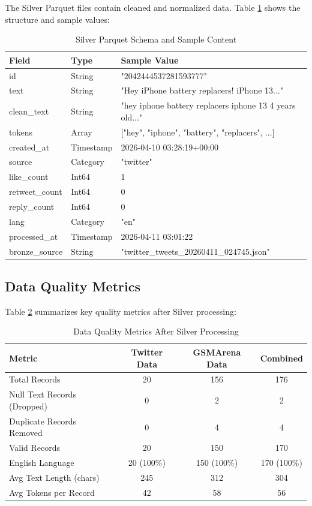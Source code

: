 \documentclass[11pt,a4paper]{article}
\begin{document}
The Silver Parquet files contain cleaned and normalized data. Table \ref{tab:silver-schema-content} shows the structure and sample values:

\begin{table}[H]
\centering
\begin{tabular}{>{\ttfamily}l l p{5cm}}
\toprule
\textbf{Field} & \textbf{Type} & \textbf{Sample Value} \\
\midrule
id & String & "2042444537281593777" \\
text & String & "Hey iPhone battery replacers! iPhone 13..." \\
clean\_text & String & "hey iphone battery replacers iphone 13 4 years old..." \\
tokens & Array & ["hey", "iphone", "battery", "replacers", ...] \\
created\_at & Timestamp & 2026-04-10 03:28:19+00:00 \\
source & Category & "twitter" \\
like\_count & Int64 & 1 \\
retweet\_count & Int64 & 0 \\
reply\_count & Int64 & 0 \\
lang & Category & "en" \\
processed\_at & Timestamp & 2026-04-11 03:01:22 \\
bronze\_source & String & "twitter\_tweets\_20260411\_024745.json" \\
\bottomrule
\end{tabular}
\caption{Silver Parquet Schema and Sample Content}
\label{tab:silver-schema-content}
\end{table}

\subsection{Data Quality Metrics}

Table \ref{tab:quality-metrics} summarizes key quality metrics after Silver processing:

\begin{table}[H]
\centering
\begin{tabular}{l c c c}
\toprule
\textbf{Metric} & \textbf{Twitter Data} & \textbf{GSMArena Data} & \textbf{Combined} \\
\midrule
Total Records & 20 & 156 & 176 \\
Null Text Records (Dropped) & 0 & 2 & 2 \\
Duplicate Records Removed & 0 & 4 & 4 \\
Valid Records & 20 & 150 & 170 \\
English Language & 20 (100\%) & 150 (100\%) & 170 (100\%) \\
Avg Text Length (chars) & 245 & 312 & 304 \\
Avg Tokens per Record & 42 & 58 & 56 \\
\bottomrule
\end{tabular}
\caption{Data Quality Metrics After Silver Processing}
\label{tab:quality-metrics}
\end{table}
\end{document}
